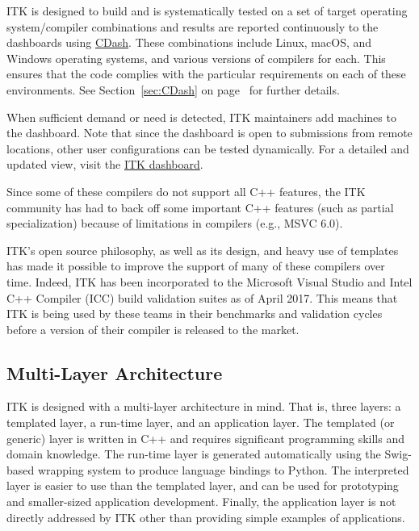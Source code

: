 ITK is designed to build and is systematically tested on a set of target
operating system/compiler combinations and results are reported continuously
to the dashboards using \href{https://www.cdash.org/}{CDash}. These combinations
include Linux, macOS, and Windows operating systems, and various versions of
compilers for each. This ensures that the code complies with the particular
requirements on each of these environments. See Section~\ref{sec:CDash}
on page~\pageref{sec:CDash} for further details.

When sufficient demand or need is detected, ITK maintainers add machines to the
dashboard. Note that since the dashboard is open to submissions from remote
locations, other user configurations can be tested dynamically. For a detailed
and updated view, visit the
\href{https://open.cdash.org/index.php?project=Insight}{ITK dashboard}.

Since some of these compilers do not support all C++ features, the ITK community
has had to back off some important C++ features (such as partial specialization)
because of limitations in compilers (e.g., MSVC 6.0).

ITK's open source philosophy, as well as its design, and heavy use of templates
has made it possible to improve the support of many of these compilers over
time. Indeed, ITK has been incorporated to the Microsoft Visual Studio and Intel
C++ Compiler (ICC) build validation suites as of April 2017. This means that
ITK is being used by these teams in their benchmarks and validation cycles
before a version of their compiler is released to the market.


\subsection{Multi-Layer Architecture}
\label{subsec:MultiLayerArchitecture}

ITK is designed with a multi-layer architecture in mind. That is, three layers:
a templated layer, a run-time layer, and an application layer. The templated (or
generic) layer is written in C++ and requires significant programming skills and
domain knowledge. The run-time layer is generated automatically using the
Swig-based wrapping system to produce language bindings to Python. The
interpreted layer is easier to use than the templated layer, and can be used for
prototyping and smaller-sized application development. Finally, the application
layer is not directly addressed by ITK other than providing simple examples of
applications.


